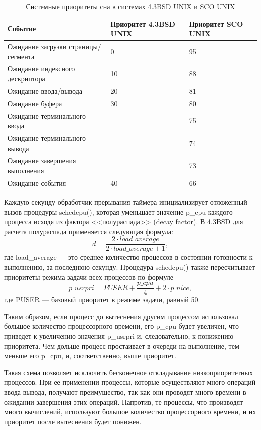 \documentclass[a4paper,oneside,14pt]{extarticle}
\begin{document}
\begin{table}[h]
    \caption{Системные приоритеты сна в системах 4.3BSD UNIX и SCO UNIX}
	\begin{center}
		\begin{tabular}{|l|p{75pt}|p{75pt}|} 
			\hline
			{Событие} & {Приоритет 4.3BSD UNIX} & {Приоритет SCO UNIX}\\
			\hline
			{Ожидание загрузки страницы/сегмента} & 0 & 95\\
			\hline
			{Ожидание индексного дескриптора} & 10 & 88\\
			\hline
			{Ожидание ввода/вывода} & 20 & 81 \\
			\hline
			{Ожидание буфера} & 30 & 80\\
			\hline
			{Ожидание терминального ввода} &    & 75\\
			\hline
			{Ожидание терминального вывода} &    & 74\\
			\hline
			{Ожидание завершения выполнения} &    & 73\\
			\hline
			{Ожидание события} & 40 & 66\\
			\hline
		\end{tabular}
	\end{center}
	\label{tbl:sleeppriority}
\end{table}

Каждую секунду обработчик прерывания таймера инициализирует отложенный вызов процедуры schedcpu(), которая уменьшает значение p{\_}cpu каждого процесса исходя из фактора <<полураспада>> (decay factor).
В {\ttfamily 4.3BSD} для расчета полураспада применяется следующая формула:
\[
d = \frac{2\cdot load{\_}average}{2\cdot load{\_}average + 1},
\]
где load{\_}average --- это среднее количество процессов в состоянии готовности к выполнению, за последнюю секунду.
Процедура schedcpu() также пересчитывает приоритеты режима задачи всех процессов по формуле
\[
{p\_usrpri} = PUSER + \frac{p{\_}cpu}{4} + 2\cdot {p{\_}nice},
\]
где {\ttfamily PUSER} --- базовый приоритет в режиме задачи, равный 50.

Таким образом, если процесс до вытеснения другим процессом использовал большое количество процессорного времени, его p{\_}cpu будет увеличен, что приведет к увеличению значения p{\_}usrpri и, следовательно, к понижению приоритета.
Чем дольше процесс простаивает в очереди на выполнение, тем меньше его p{\_}cpu, и, соответственно, выше приоритет. 

Такая схема позволяет исключить бесконечное откладывание низкоприоритетных процессов.
При ее применении процессы, которые осуществляют много операций ввода-вывода, получают преимущество, так как они проводят много времени в ожидании завершения этих операций.
Напротив, те процессы, что производят много вычислений, используют большое количество процессорного времени, и их приоритет после вытеснения будет понижен. 
\end{document}
